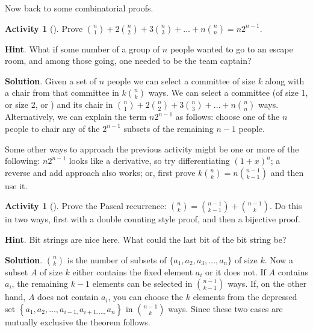 \documentclass[10pt,]{book}
\theoremstyle{plain}
\theoremstyle{definition}
\theoremstyle{definition}
\theoremstyle{definition}
\newtheorem{activity}[project]{Activity}
\theoremstyle{definition}
\numberwithin{equation}{chapter}
\begin{document}
\hypertarget{p-599}{}%
Now back to some combinatorial proofs.%
\begin{activity}[]\label{act_anysizecommittee}
\hypertarget{p-600}{}%
Prove \(\binom{n}{1} + 2 \binom{n}{2} + 3 \binom{n}{3} + \ldots + n \binom{n}{n} = n2^{n - 1}\).%
\par\smallskip%
\noindent\textbf{Hint}.\hypertarget{hint-29}{}\quad%
\hypertarget{p-601}{}%
What if some number of a group of \(n\) people wanted to go to an escape room, and among those going, one needed to be the team captain?%
\par\smallskip%
\noindent\textbf{Solution}.\hypertarget{solution-49}{}\quad%
\hypertarget{p-602}{}%
Given a set of \(n\) people we can select a committee of size \(k\) along with a chair from that committee in \(k \binom{n}{k}\) ways. We can select a committee (of size 1, or size 2, or \textellipsis{}) and its chair in \(\binom{n}{1} + 2 \binom{n}{2} + 3 \binom{n}{3} + \ldots + n \binom{n}{n}\) ways. Alternatively, we can explain the term \(n2^{n - 1}\) as follows: choose one of the \(n\) people to chair any of the \(2^{n - 1}\) subsets of the remaining \(n - 1\) people.%
\end{activity}
\hypertarget{p-603}{}%
Some other ways to approach the previous activity might be one or more of the following: \(n2^{n - 1}\) looks like a derivative, so try differentiating \(\left( 1 + x \right)^{n}\); a reverse and add approach also works; or, first prove \(k \binom{n}{k} = n \binom{n - 1}{k - 1}\) and then use it.%
\begin{activity}[]\label{activity-42}
\hypertarget{p-604}{}%
Prove the Pascal recurrence: \(\binom{n}{k} = \binom{n - 1}{k-1} + \binom{n - 1}{k}\).  Do this in two ways, first with a double counting style proof, and then a bijective proof.%
\par\smallskip%
\noindent\textbf{Hint}.\hypertarget{hint-30}{}\quad%
\hypertarget{p-605}{}%
Bit strings are nice here.  What could the last bit of the bit string be?%
\par\smallskip%
\noindent\textbf{Solution}.\hypertarget{solution-50}{}\quad%
\hypertarget{p-606}{}%
 \(\binom{n}{k}\) is the number of subsets of \(\{ a_{1},a_{2},a_{3},\ldots,a_{n}\}\) of size \(k\). Now a subset \(A\) of size \(k\) either contains the fixed element \(a_{i}\) or it does not. If \(A\) contains \(a_{i}\), the remaining \(k - 1\) elements can be selected in \(\binom{n - 1}{k - 1}\) ways. If, on the other hand, \(A\) does not contain \(a_{i}\), you can choose the \(k\) elements from the depressed set \(\left\{ a_{1},a_{2},\ldots,a_{i - 1,}a_{i + 1,\ldots,}a_{n} \right\}\) in \(\binom{n - 1}{k}\) ways. Since these two cases are mutually exclusive the theorem follows.%
\end{activity}
\end{document}
